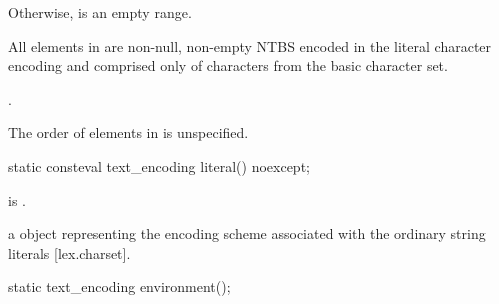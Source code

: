 \documentclass{wg21}
\begin{document}
\begin{addedblock}
\begin{itemdescr}
Otherwise,  is an empty range.

All elements in  are non-null, non-empty NTBS encoded in the literal character encoding and comprised only of characters from the basic character set.

\returns {}.

\begin{note}
The order of elements in  is unspecified.
\end{note}

\end{itemdescr}

\begin{itemdecl}
static consteval text_encoding literal() noexcept;
\end{itemdecl}
\begin{itemdescr}

\mandates {} is .

\returns a  object representing the encoding scheme associated with the ordinary string literals [lex.charset].

\end{itemdescr}

%
%
%
%
%



\begin{itemdecl}
static text_encoding environment();
\end{itemdecl}


\begin{itemdescr}


\end{itemdescr}
\end{addedblock}
\end{document}
